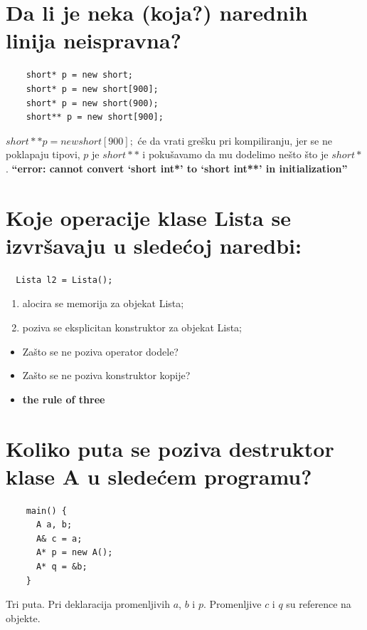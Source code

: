 \documentclass[a4paper]{article}
\begin{document}
\section{Da li je neka (koja?) narednih linija neispravna?}
    \begin{lstlisting}
    short* p = new short;
    short* p = new short[900];
    short* p = new short(900);
    short** p = new short[900];\end{lstlisting}

    $short** p = new short[900];$ će da vrati grešku pri kompiliranju, jer se ne poklapaju tipovi, 
    $p$ je $short**$ i pokušavamo da mu dodelimo nešto što je $short*$.
    \textbf{“error: cannot convert ‘short int*’ to ‘short int**’ in initialization”}
 
\section{Koje operacije klase Lista se izvršavaju u sledećoj naredbi:}
  \begin{lstlisting}
  Lista l2 = Lista();\end{lstlisting}

    \begin{enumerate}
      \item alocira se memorija za objekat Lista;
      \item poziva se eksplicitan konstruktor za objekat Lista;
    \end{enumerate}
    \thinspace
    \begin{itemize}
      \item Zašto se ne poziva operator dodele?
      \item Zašto se ne poziva konstruktor kopije? \cite{gfg_copy_assignment}
            \cite{cppref_copy_assignment}
      \item \textbf{the rule of three} \cite{sof_rule_of_three}
    \end{itemize}
    
\section{Koliko puta se poziva destruktor klase A u sledećem programu?}
    \begin{lstlisting}
    main() {
      A a, b;
      A& c = a;
      A* p = new A();
      A* q = &b;
    }\end{lstlisting}

    Tri puta. Pri deklaracija promenljivih $a$, $b$ i $p$. Promenljive $c$ i $q$ su reference 
    na objekte.
\end{document}
